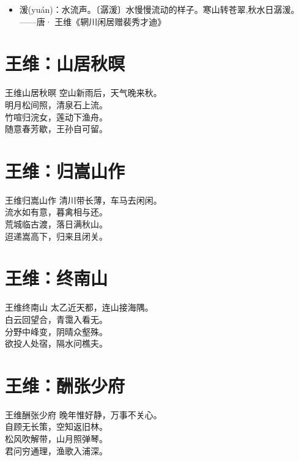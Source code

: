 \documentclass[12pt,oneside,a5paper]{book}
\begin{document}
\begin{itemize}
\item 湲(yuán)：水流声。〔潺湲〕水慢慢流动的样子。寒山转苍翠,秋水日潺湲。——唐· 王维《辋川闲居赠裴秀才迪》
\end{itemize}

\chapter{王维：山居秋暝}
\begin{poemzh}{王维}{山居秋暝}
空山新雨后，天气晚来秋。\\
明月松间照，清泉石上流。\\
竹喧归浣女，莲动下渔舟。\\
随意春芳歇，王孙自可留。\\ 
\end{poemzh}

\chapter{王维：归嵩山作}
\begin{poemzh}{王维}{归嵩山作}
清川带长薄，车马去闲闲。\\
流水如有意，暮禽相与还。\\
荒城临古渡，落日满秋山。\\
迢递嵩高下，归来且闭关。\\ 
\end{poemzh}

\chapter{王维：终南山}
\begin{poemzh}{王维}{终南山}
太乙近天都，连山接海隅。\\
白云回望合，青霭入看无。\\
分野中峰变，阴晴众壑殊。\\
欲投人处宿，隔水问樵夫。\\ 
\end{poemzh}

\chapter{王维：酬张少府}
\begin{poemzh}{王维}{酬张少府}
晚年惟好静，万事不关心。\\
自顾无长策，空知返旧林。\\
松风吹解带，山月照弹琴。\\
君问穷通理，渔歌入浦深。\\ 
\end{poemzh}
\end{document}
